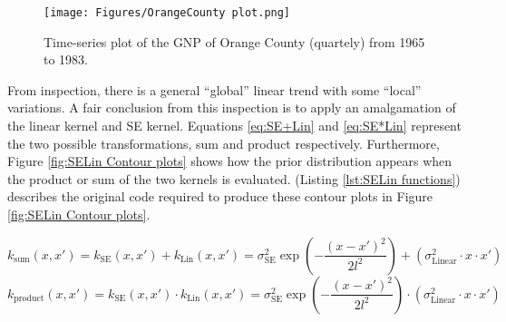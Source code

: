 \documentclass[12pt,a4paper]{article}
\begin{document}
\begin{figure}[h]
\centering
\texttt{[image: Figures/OrangeCounty plot.png]} 
\caption{Time-series plot of the GNP of Orange County (quartely) from 1965 to 1983.} \label{fig:Orange County plot}
\end{figure}

From inspection, there is a general ``global'' linear trend with some ``local'' variations. A fair conclusion from this inspection is to apply an amalgamation of the linear kernel and SE kernel. Equations \eqref{eq:SE+Lin} and \eqref{eq:SE*Lin} represent the two possible transformations, sum and product respectively. Furthermore, Figure \ref{fig:SELin Contour plots} shows how the prior distribution appears when the product or sum of the two kernels is evaluated. (Listing \ref{lst:SELin functions}) describes the original code required to produce these contour plots in Figure \ref{fig:SELin Contour plots}. 

\begin{equation}
k_{\text{sum}}(x, x') =  k_{\text{SE}}(x, x') + k_{\text{Lin}}(x, x')
=  \sigma^2_{\text{SE}} \exp\left( -\frac{(x - x')^2}{2l^2} \right) + \left( \sigma^2_{\text{Linear}} \cdot x \cdot x' \right) 
\label{eq:SE+Lin}
\end{equation}
\begin{equation}
k_{\text{product}}(x, x') =  k_{\text{SE}}(x, x') \cdot k_{\text{Lin}}(x, x')
=  \sigma^2_{\text{SE}} \exp\left( -\frac{(x - x')^2}{2l^2} \right) \cdot \left( \sigma^2_{\text{Linear}} \cdot x \cdot x' \right) 
\label{eq:SE*Lin}
\end{equation}
\end{document}
